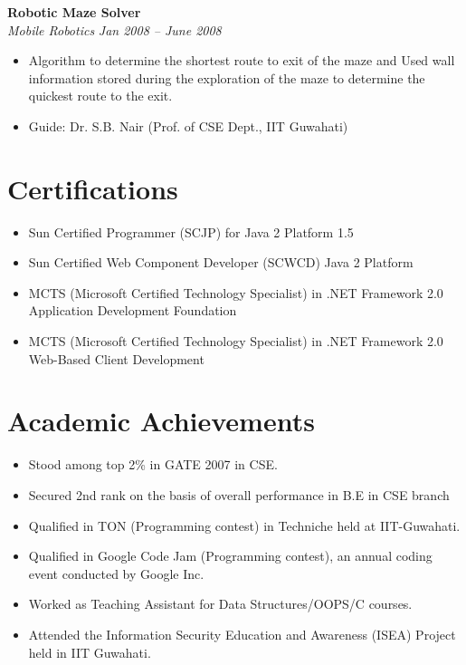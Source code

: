 \documentclass[margin,line]{resume}
\begin{document}
\begin{resume}
    \textbf{Robotic Maze Solver}\vspace{0mm}\\\vspace{0mm}%
    \textsl{Mobile Robotics} \hfill \textsl{Jan 2008 -- June 2008}  
       \begin{itemize} 
	\item Algorithm to determine the shortest route to exit of the maze and Used wall information stored during the 
           exploration of the maze to determine the quickest route to the exit.
	\item Guide: Dr. S.B. Nair (Prof. of CSE Dept., IIT Guwahati)
       \end{itemize}

   
    


    \section{\mysidestyle Certifications}
     \begin{itemize}
      \item Sun Certified Programmer (SCJP) for Java 2 Platform 1.5
      \item Sun Certified Web Component Developer (SCWCD) Java 2 Platform
      \item MCTS (Microsoft Certified Technology Specialist) in .NET Framework 2.0 Application Development Foundation
      \item MCTS (Microsoft Certified Technology Specialist) in .NET Framework 2.0 Web-Based Client Development
\end{itemize}

     
 \section{\mysidestyle Academic Achievements}
\begin{itemize}
  \item Stood among top 2\% in GATE 2007 in CSE.
   \item Secured 2nd rank on the basis of overall performance in B.E in CSE branch
\item Qualified in TON (Programming contest) in Techniche held at IIT-Guwahati. 
\item Qualified in Google Code Jam (Programming contest), an annual coding event conducted by Google Inc.
\item Worked as Teaching Assistant for Data Structures/OOPS/C courses.
\item Attended the Information Security Education and Awareness (ISEA) Project held in IIT Guwahati.
 \end{itemize}


\end{resume}
\end{document}
